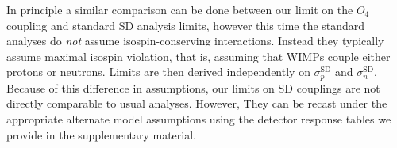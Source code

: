 In principle a similar comparison can be done between our limit on the $O_4$ coupling and standard SD analysis limits, however this time the standard analyses do {\em not} assume isospin-conserving interactions. Instead they typically assume maximal isospin violation, that is, assuming that WIMPs couple either protons or neutrons. Limits are then derived independently on $\sigma_{p}^\mathrm{SD}$ and $\sigma_{n}^\mathrm{SD}$. Because of this difference in assumptions, our limits on SD couplings are not directly comparable to usual analyses. However, They can be recast under the appropriate alternate model assumptions using the detector response tables we provide in the supplementary material.
 
